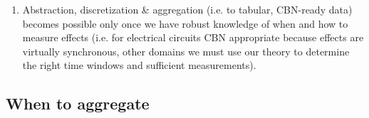 \documentclass{cambridge7A}%
\newcommand{\ntodo}[2][]{\vspace{0.1cm} \hfil \todo[caption={\textbf{NB}}, size=\footnotesize, color = aliceblue, inline, #1]{#2}}
\begin{document}
\begin{enumerate}
    \item Abstraction, discretization \& aggregation (i.e. to tabular, CBN-ready data) becomes possible only once we have robust knowledge of when and how to measure effects (i.e. for electrical circuits CBN appropriate because effects are virtually synchronous, other domains we must use our theory to determine the right time windows and sufficient measurements).

 \end{enumerate}

\subsection{When to aggregate}
    
\end{document}
